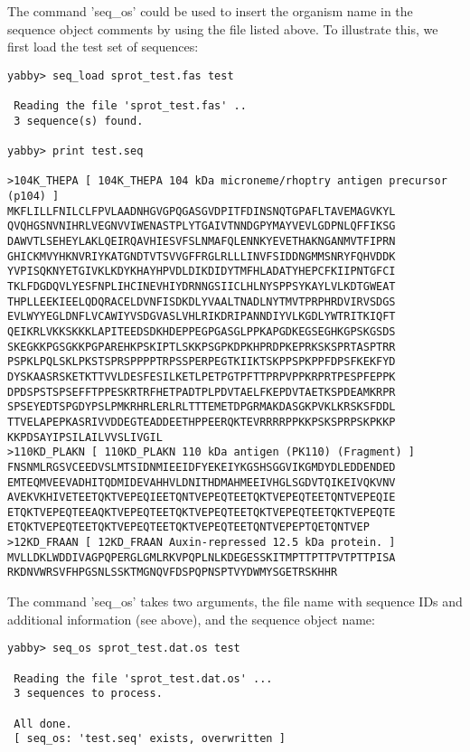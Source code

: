 The command 'seq\_os' could be used to insert the organism name
in the sequence object comments by using the file listed above.
To illustrate this, we first load the test set of sequences:

\begin{verbatim}
yabby> seq_load sprot_test.fas test

 Reading the file 'sprot_test.fas' ..
 3 sequence(s) found.

yabby> print test.seq

>104K_THEPA [ 104K_THEPA 104 kDa microneme/rhoptry antigen precursor (p104) ]
MKFLILLFNILCLFPVLAADNHGVGPQGASGVDPITFDINSNQTGPAFLTAVEMAGVKYL
QVQHGSNVNIHRLVEGNVVIWENASTPLYTGAIVTNNDGPYMAYVEVLGDPNLQFFIKSG
DAWVTLSEHEYLAKLQEIRQAVHIESVFSLNMAFQLENNKYEVETHAKNGANMVTFIPRN
GHICKMVYHKNVRIYKATGNDTVTSVVGFFRGLRLLLINVFSIDDNGMMSNRYFQHVDDK
YVPISQKNYETGIVKLKDYKHAYHPVDLDIKDIDYTMFHLADATYHEPCFKIIPNTGFCI
TKLFDGDQVLYESFNPLIHCINEVHIYDRNNGSIICLHLNYSPPSYKAYLVLKDTGWEAT
THPLLEEKIEELQDQRACELDVNFISDKDLYVAALTNADLNYTMVTPRPHRDVIRVSDGS
EVLWYYEGLDNFLVCAWIYVSDGVASLVHLRIKDRIPANNDIYVLKGDLYWTRITKIQFT
QEIKRLVKKSKKKLAPITEEDSDKHDEPPEGPGASGLPPKAPGDKEGSEGHKGPSKGSDS
SKEGKKPGSGKKPGPAREHKPSKIPTLSKKPSGPKDPKHPRDPKEPRKSKSPRTASPTRR
PSPKLPQLSKLPKSTSPRSPPPPTRPSSPERPEGTKIIKTSKPPSPKPPFDPSFKEKFYD
DYSKAASRSKETKTTVVLDESFESILKETLPETPGTPFTTPRPVPPKRPRTPESPFEPPK
DPDSPSTSPSEFFTPPESKRTRFHETPADTPLPDVTAELFKEPDVTAETKSPDEAMKRPR
SPSEYEDTSPGDYPSLPMKRHRLERLRLTTTEMETDPGRMAKDASGKPVKLKRSKSFDDL
TTVELAPEPKASRIVVDDEGTEADDEETHPPEERQKTEVRRRRPPKKPSKSPRPSKPKKP
KKPDSAYIPSILAILVVSLIVGIL
>110KD_PLAKN [ 110KD_PLAKN 110 kDa antigen (PK110) (Fragment) ]
FNSNMLRGSVCEEDVSLMTSIDNMIEEIDFYEKEIYKGSHSGGVIKGMDYDLEDDENDED
EMTEQMVEEVADHITQDMIDEVAHHVLDNITHDMAHMEEIVHGLSGDVTQIKEIVQKVNV
AVEKVKHIVETEETQKTVEPEQIEETQNTVEPEQTEETQKTVEPEQTEETQNTVEPEQIE
ETQKTVEPEQTEEAQKTVEPEQTEETQKTVEPEQTEETQKTVEPEQTEETQKTVEPEQTE
ETQKTVEPEQTEETQKTVEPEQTEETQKTVEPEQTEETQNTVEPEPTQETQNTVEP
>12KD_FRAAN [ 12KD_FRAAN Auxin-repressed 12.5 kDa protein. ]
MVLLDKLWDDIVAGPQPERGLGMLRKVPQPLNLKDEGESSKITMPTTPTTPVTPTTPISA
RKDNVWRSVFHPGSNLSSKTMGNQVFDSPQPNSPTVYDWMYSGETRSKHHR
\end{verbatim}

The command 'seq\_os' takes two arguments, the file name with 
sequence IDs and additional information (see above), and the
sequence object name:

\begin{verbatim}
yabby> seq_os sprot_test.dat.os test

 Reading the file 'sprot_test.dat.os' ...
 3 sequences to process.

 All done.
 [ seq_os: 'test.seq' exists, overwritten ]
\end{verbatim}

